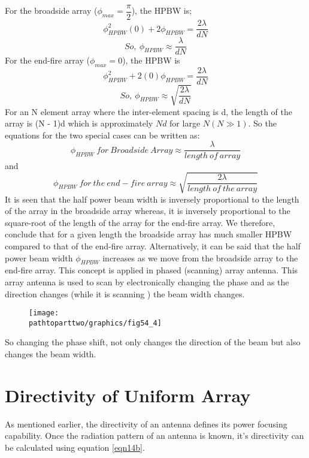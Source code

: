For the broadside array ($\phi_{max} = \dfrac{\pi}{2}$), the HPBW is; 
$$ \phi^2_{HPBW}(0) + 2\phi_{HPBW} = \dfrac{2\lambda}{dN}$$
\begin{equation}
So, \ \phi_{HPBW} \approx \dfrac{\lambda}{dN}
\label{eqn39} 
\end{equation} 
For the end-fire array ($\phi_{max} = 0$), the HPBW is 
$$ \phi^2_{HPBW} + 2(0)\phi_{HPBW} = \dfrac{2\lambda}{dN} $$
\begin{equation}
So, \ \phi_{HPBW} \approx \sqrt{\dfrac{2\lambda}{dN}}
\label{eqn40}
\end{equation}
For an N element array where the inter-element spacing is d, the length of the array is (N - 1)d which is approximately $Nd$ for large $N(N\gg 1)$. So the equations for the two special cases can be written as: 
$$ \phi_{HPBW} \ for \ Broadside \ Array \approx \dfrac{\lambda}{length \ of \ array}$$ and
$$ \phi_{HPBW} \ for \ the \ end-fire \ array \approx \sqrt{\dfrac{2\lambda}{length \ of \  the \ array}}$$
It is seen that the half power beam width is inversely proportional to the length of the array in the broadside array whereas, it is inversely proportional to the square-root of the length of the array for the end-fire array. We therefore, conclude that for a given length the broadside array has much smaller HPBW compared to that of the end-fire array. Alternatively,
it can be said that the half power beam width $\phi_{HPBW}$ increases as we move from the broadside array to the end-fire array. This concept is applied in phased (scanning) array antenna. This array antenna is used to scan by electronically changing the phase and as the direction changes (while it is scanning ) the beam width changes.
\begin{figure}[h]
\texttt{[image: \\pathtoparttwo/graphics/fig54\_4]}
\centering
\caption{}
\label{54.7}
\end{figure}

So changing the phase shift, not only changes the direction of the beam but also changes the beam width. 

\section{Directivity of Uniform Array}

As mentioned earlier, the directivity of an antenna defines its power focusing capability. Once the radiation pattern of an antenna is known, it's directivity can be calculated using equation \ref{eqn14b}.


